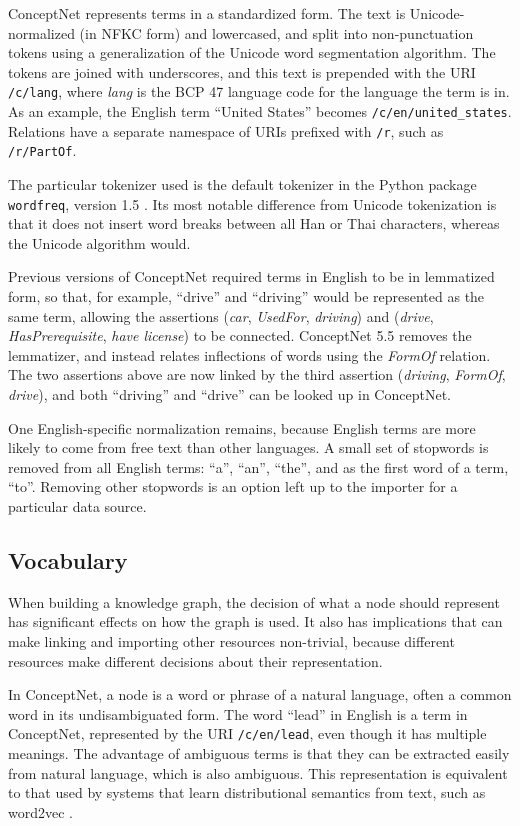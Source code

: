 \documentclass[letterpaper]{article}
\begin{document}
ConceptNet represents terms in a standardized form. The text is
Unicode-normalized (in NFKC form) and lowercased, and split into
non-punctuation tokens using a generalization of the Unicode word
segmentation algorithm. The tokens are joined with underscores, and this
text is prepended with the URI \texttt{/c/lang}, where \emph{lang} is
the BCP 47 language code for the language the term is in. As an example,
the English term ``United States'' becomes
\texttt{/c/en/united\_states}. Relations have a separate namespace of
URIs prefixed with \texttt{/r}, such as \texttt{/r/PartOf}.

The particular tokenizer used is the default tokenizer in the Python package
\texttt{wordfreq}, version 1.5 \cite{speer2016wordfreq}. Its most notable
difference from Unicode tokenization is that it does not insert word breaks
between all Han or Thai characters, whereas the Unicode algorithm would.

Previous versions of ConceptNet required terms in English to be in lemmatized
form, so that, for example, ``drive'' and ``driving'' would be represented as
the same term, allowing the assertions (\emph{car}, \emph{UsedFor},
\emph{driving}) and (\emph{drive}, \emph{HasPrerequisite}, \emph{have license})
to be connected. ConceptNet 5.5 removes the lemmatizer, and instead
relates inflections of words using the \emph{FormOf} relation. The two
assertions above are now linked by the third assertion (\emph{driving},
\emph{FormOf}, \emph{drive}), and both ``driving'' and ``drive'' can be looked
up in ConceptNet.

One English-specific normalization remains, because English terms are more
likely to come from free text than other languages. A small set of stopwords is
removed from all English terms: ``a'', ``an'', ``the'', and as the first word
of a term, ``to''. Removing other stopwords is an option left up to the
importer for a particular data source.


\subsection{Vocabulary}\label{vocabulary}

When building a knowledge graph, the decision of what a node should
represent has significant effects on how the graph is used. It also has
implications that can make linking and importing other resources
non-trivial, because different resources make different decisions about
their representation.

In ConceptNet, a node is a word or phrase of a natural language, often a
common word in its undisambiguated form. The word ``lead'' in English is
a term in ConceptNet, represented by the URI \texttt{/c/en/lead}, even
though it has multiple meanings. The advantage of ambiguous terms is
that they can be extracted easily from natural language, which is also
ambiguous. This representation is equivalent to that used by systems
that learn distributional semantics from text, such as word2vec
\cite{mikolov2013word2vec}.
\end{document}
